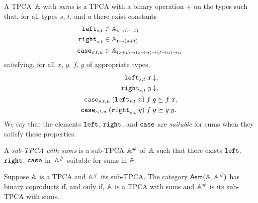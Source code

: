 \begin{definition}
  A TPCA~$\AA$ with \emph{sums} is a TPCA with a binary operation $+$
  on the types such that, for all types $s$, $t$, and $u$ there exist
  constants
  \begin{align*}
    \combLeft_{s,t} &\in \Atyp{s \to (s + t)} \\
    \combRight_{s,t} &\in \Atyp{t \to (s + t)} \\
    \combCase_{s,t,u} &\in \Atyp{(s + t) \to (s \to u) \to (t \to u) \to u}
  \end{align*}
  satisfying, for all $x$, $y$, $f$, $g$ of appropriate types,
  \begin{align*}
    \defined{\combLeft_{s,t}\;x} &, \\
    \defined{\combRight_{s,t}\;y} &,\\
    \combCase_{s,t,u}\;(\combLeft_{s,t}\;x)\;f\;g &\klgeq f\;x, \\
    \combCase_{s,t,u}\;(\combRight_{s,t}\;y)\;f\;g &\klgeq g\;y.
  \end{align*}
  We say that the elements $\combLeft$, $\combRight$, and $\combCase$
  are \emph{suitable} for sums when they satisfy these properties.

  A \emph{sub-TPCA with sums} is a sub-TPCA $\compAA$ of~$\AA$ such
  that there exists $\combLeft$, $\combRight$, $\combCase$
  in~$\compAA$ suitable for sums in $\AA$.
\end{definition}

\begin{proposition}
  \label{prop:asm-coproducts-iff-tpca-sums}
  Suppose $\AA$ is a TPCA and $\compAA$ its sub-TPCA. The category
  $\AsmA$ has binary coproducts if, and only if, $\AA$ is a TPCA with
  sums and $\compAA$ is its sub-TPCA with sums.
\end{proposition}

